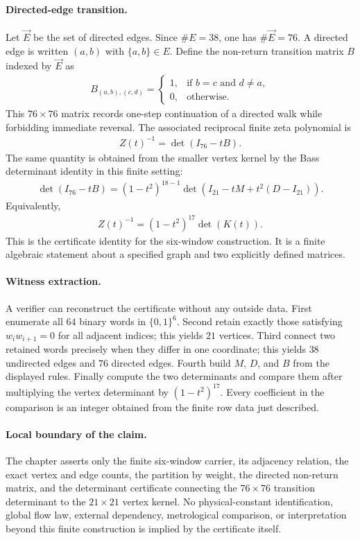 \paragraph{Directed-edge transition.}
Let $\vec E$ be the set of directed edges.  Since $\#E=38$, one has $\#\vec E=76$.  A directed edge is written $(a,b)$ with $\{a,b\}\in E$.  Define the non-return transition matrix $B$ indexed by $\vec E$ as
$$
\begin{aligned}
B_{(a,b),(c,d)}=\begin{cases}
1, & \text{if } b=c \text{ and } d\ne a,\\
0, & \text{otherwise.}
\end{cases}
\end{aligned}
$$
This $76\times 76$ matrix records one-step continuation of a directed walk while forbidding immediate reversal.  The associated reciprocal finite zeta polynomial is
$$
\begin{aligned}
Z(t)^{-1}=\det(I_{76}-tB).
\end{aligned}
$$
The same quantity is obtained from the smaller vertex kernel by the Bass determinant identity in this finite setting:
$$
\begin{aligned}
\det(I_{76}-tB)=(1-t^2)^{18-1}\det(I_{21}-tM+t^2(D-I_{21})).
\end{aligned}
$$
Equivalently,
$$
\begin{aligned}
Z(t)^{-1}=(1-t^2)^{17}\det(K(t)).
\end{aligned}
$$
This is the certificate identity for the six-window construction.  It is a finite algebraic statement about a specified graph and two explicitly defined matrices.

\paragraph{Witness extraction.}
A verifier can reconstruct the certificate without any outside data.  First enumerate all $64$ binary words in $\{0,1\}^6$.  Second retain exactly those satisfying $w_iw_{i+1}=0$ for all adjacent indices; this yields $21$ vertices.  Third connect two retained words precisely when they differ in one coordinate; this yields $38$ undirected edges and $76$ directed edges.  Fourth build $M$, $D$, and $B$ from the displayed rules.  Finally compute the two determinants and compare them after multiplying the vertex determinant by $(1-t^2)^{17}$.  Every coefficient in the comparison is an integer obtained from the finite row data just described.

\paragraph{Local boundary of the claim.}
The chapter asserts only the finite six-window carrier, its adjacency relation, the exact vertex and edge counts, the partition by weight, the directed non-return matrix, and the determinant certificate connecting the $76\times 76$ transition determinant to the $21\times 21$ vertex kernel.  No physical-constant identification, global flow law, external dependency, metrological comparison, or interpretation beyond this finite construction is implied by the certificate itself.